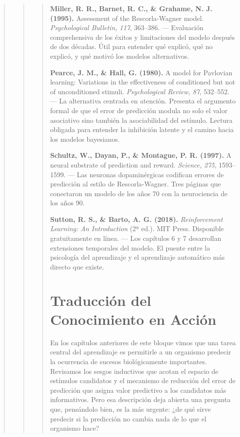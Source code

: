\documentclass[
  letterpaper,
  DIV=11,
  numbers=noendperiod]{scrreprt}
\begin{document}
\begin{tcolorbox}[enhanced jigsaw, toprule=.15mm, arc=.35mm, colback=white, opacityback=0, colframe=quarto-callout-note-color-frame, breakable, rightrule=.15mm, left=2mm, leftrule=.75mm, bottomrule=.15mm]
\begin{quote}
\begin{quote}
\begin{quote}
\textbf{Miller, R. R., Barnet, R. C., \& Grahame, N. J. (1995).}
Assessment of the Rescorla-Wagner model. \emph{Psychological Bulletin,
117}, 363--386. --- Evaluación comprehensiva de los éxitos y
limitaciones del modelo después de dos décadas. Útil para entender qué
explicó, qué no explicó, y qué motivó los modelos alternativos.

\textbf{Pearce, J. M., \& Hall, G. (1980).} A model for Pavlovian
learning: Variations in the effectiveness of conditioned but not of
unconditioned stimuli. \emph{Psychological Review, 87}, 532--552. --- La
alternativa centrada en atención. Presenta el argumento formal de que el
error de predicción modula no solo el valor asociativo sino también la
asociabilidad del estímulo. Lectura obligada para entender la inhibición
latente y el camino hacia los modelos bayesianos.

\textbf{Schultz, W., Dayan, P., \& Montague, P. R. (1997).} A neural
substrate of prediction and reward. \emph{Science, 275}, 1593--1599. ---
Las neuronas dopaminérgicas codifican errores de predicción al estilo de
Rescorla-Wagner. Tres páginas que conectaron un modelo de los años 70
con la neurociencia de los años 90.

\textbf{Sutton, R. S., \& Barto, A. G. (2018).} \emph{Reinforcement
Learning: An Introduction} (2ª ed.). MIT Press. Disponible gratuitamente
en línea. --- Los capítulos 6 y 7 desarrollan extensiones temporales del
modelo. El puente entre la psicología del aprendizaje y el aprendizaje
automático más directo que existe.


\chapter{Traducción del Conocimiento en
Acción}\label{traducciuxf3n-del-conocimiento-en-acciuxf3n}

En los capítulos anteriores de este bloque vimos que una tarea central
del aprendizaje es permitirle a un organismo predecir la ocurrencia de
sucesos biológicamente importantes. Revisamos los sesgos inductivos que
acotan el espacio de estímulos candidatos y el mecanismo de reducción
del error de predicción que asigna valor predictivo a los candidatos más
informativos. Pero esa descripción deja abierta una pregunta que,
pensándolo bien, es la más urgente: ¿de qué sirve predecir si la
predicción no cambia nada de lo que el organismo hace?


\end{quote}
\end{quote}
\end{quote}
\end{tcolorbox}
\end{document}
